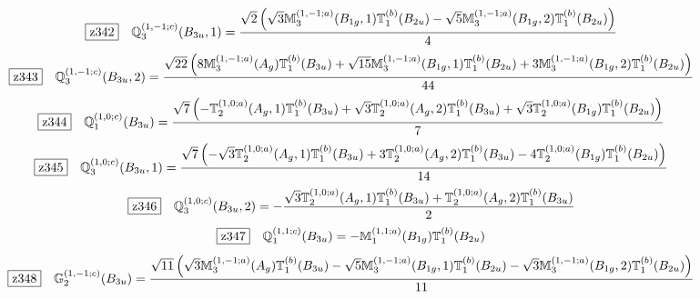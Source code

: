 \documentclass[fleqn,10pt,landscape]{jsarticle}
\begin{document}
\begin{dmath*}
\hspace*{3mm}\fbox{z342}\quad \mathbb{Q}_{3}^{(1,-1;c)}(B_{3u},1)=\frac{\sqrt{2} \left(\sqrt{3} \mathbb{M}_{3}^{(1,-1;a)}(B_{1g},1) \mathbb{T}_{1}^{(b)}(B_{2u}) - \sqrt{5} \mathbb{M}_{3}^{(1,-1;a)}(B_{1g},2) \mathbb{T}_{1}^{(b)}(B_{2u})\right)}{4}
\end{dmath*}
\begin{dmath*}
\hspace*{3mm}\fbox{z343}\quad \mathbb{Q}_{3}^{(1,-1;c)}(B_{3u},2)=\frac{\sqrt{22} \left(8 \mathbb{M}_{3}^{(1,-1;a)}(A_{g}) \mathbb{T}_{1}^{(b)}(B_{3u}) + \sqrt{15} \mathbb{M}_{3}^{(1,-1;a)}(B_{1g},1) \mathbb{T}_{1}^{(b)}(B_{2u}) + 3 \mathbb{M}_{3}^{(1,-1;a)}(B_{1g},2) \mathbb{T}_{1}^{(b)}(B_{2u})\right)}{44}
\end{dmath*}
\begin{dmath*}
\hspace*{3mm}\fbox{z344}\quad \mathbb{Q}_{1}^{(1,0;c)}(B_{3u})=\frac{\sqrt{7} \left(- \mathbb{T}_{2}^{(1,0;a)}(A_{g},1) \mathbb{T}_{1}^{(b)}(B_{3u}) + \sqrt{3} \mathbb{T}_{2}^{(1,0;a)}(A_{g},2) \mathbb{T}_{1}^{(b)}(B_{3u}) + \sqrt{3} \mathbb{T}_{2}^{(1,0;a)}(B_{1g}) \mathbb{T}_{1}^{(b)}(B_{2u})\right)}{7}
\end{dmath*}
\begin{dmath*}
\hspace*{3mm}\fbox{z345}\quad \mathbb{Q}_{3}^{(1,0;c)}(B_{3u},1)=\frac{\sqrt{7} \left(- \sqrt{3} \mathbb{T}_{2}^{(1,0;a)}(A_{g},1) \mathbb{T}_{1}^{(b)}(B_{3u}) + 3 \mathbb{T}_{2}^{(1,0;a)}(A_{g},2) \mathbb{T}_{1}^{(b)}(B_{3u}) - 4 \mathbb{T}_{2}^{(1,0;a)}(B_{1g}) \mathbb{T}_{1}^{(b)}(B_{2u})\right)}{14}
\end{dmath*}
\begin{dmath*}
\hspace*{3mm}\fbox{z346}\quad \mathbb{Q}_{3}^{(1,0;c)}(B_{3u},2)=- \frac{\sqrt{3} \mathbb{T}_{2}^{(1,0;a)}(A_{g},1) \mathbb{T}_{1}^{(b)}(B_{3u}) + \mathbb{T}_{2}^{(1,0;a)}(A_{g},2) \mathbb{T}_{1}^{(b)}(B_{3u})}{2}
\end{dmath*}
\begin{dmath*}
\hspace*{3mm}\fbox{z347}\quad \mathbb{Q}_{1}^{(1,1;c)}(B_{3u})=- \mathbb{M}_{1}^{(1,1;a)}(B_{1g}) \mathbb{T}_{1}^{(b)}(B_{2u})
\end{dmath*}
\begin{dmath*}
\hspace*{3mm}\fbox{z348}\quad \mathbb{G}_{2}^{(1,-1;c)}(B_{3u})=\frac{\sqrt{11} \left(\sqrt{3} \mathbb{M}_{3}^{(1,-1;a)}(A_{g}) \mathbb{T}_{1}^{(b)}(B_{3u}) - \sqrt{5} \mathbb{M}_{3}^{(1,-1;a)}(B_{1g},1) \mathbb{T}_{1}^{(b)}(B_{2u}) - \sqrt{3} \mathbb{M}_{3}^{(1,-1;a)}(B_{1g},2) \mathbb{T}_{1}^{(b)}(B_{2u})\right)}{11}
\end{dmath*}
\vspace{5mm}
\end{document}

